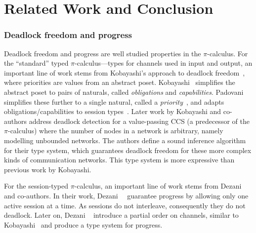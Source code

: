 \section{Related Work and Conclusion}

\subsubsection*{Deadlock freedom and progress}
Deadlock freedom and progress are well studied properties in the $\pi$-calculus.
For the ``standard'' typed $\pi$-calculus---types for channels used in input and output, an important line of work stems from Kobayashi's approach to deadlock freedom~\cite{kobayashi98}, where priorities are values from an abstract poset. Kobayashi~\cite{kobayashi06} simplifies the abstract poset to pairs of naturals, called \emph{obligations} and \emph{capabilities}. Padovani simplifies these further to a single natural, called a \emph{priority}~\cite{padovani14}, and adapts obligations/capabilities to session types~\cite{padovani13}. Later work by Kobayashi and co-authors \cite{GiachinoKL14,kobayashilaneve17} address deadlock detection for a value-passing CCS (a predecessor of the $\pi$-calculus) where the number of nodes in a network is arbitrary, namely modelling unbounded networks. The authors define a sound inference algorithm for their type system, which guarantees deadlock freedom for these more complex kinds of communication networks. This type system is more expressive than previous work by Kobayashi.

For the session-typed $\pi$-calculus, an important line of work stems from Dezani and co-authors. In their work, Dezani~\etal~\cite{dezani-ciancaglinimostrous06} guarantee progress by allowing only one active session at a time. As sessions do not interleave, consequently they do not deadlock. Later on, Dezani \etal~\cite{dezani-ciancagliniliguoro09progress} introduce a partial order on channels, similar to Kobayashi~\cite{kobayashi98} and produce a type system for progress.

